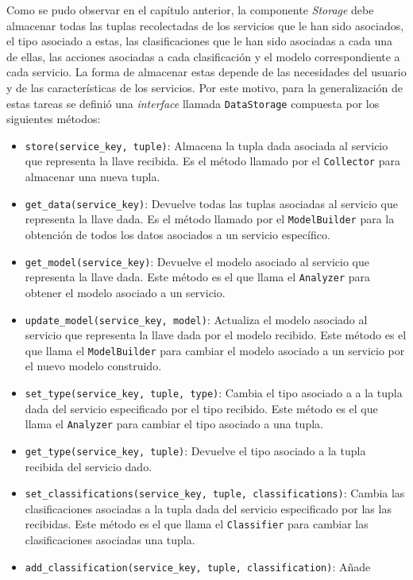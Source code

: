 Como se pudo observar en el capítulo anterior, la componente \textit{Storage} 
debe almacenar todas las tuplas recolectadas de los servicios que le han sido 
asociados, el tipo asociado a estas, las clasificaciones que le han sido 
asociadas a cada una de ellas, las acciones asociadas a cada clasificación y el 
modelo correspondiente a cada servicio. La forma de almacenar estas depende de 
las necesidades del usuario y de las características de los servicios. Por este 
motivo, para la generalización de estas tareas se definió una \textit{interface} 
llamada \texttt{DataStorage} compuesta por los siguientes métodos: 
\begin{itemize}
 \item \texttt{store(service\_key, tuple)}: Almacena la tupla dada asociada al
  servicio que representa la llave recibida. Es el método llamado por el
  \texttt{Collector} para almacenar una nueva tupla.
 \item \texttt{get\_data(service\_key)}:  Devuelve todas las tuplas asociadas al
  servicio que representa la llave dada. Es el método llamado por el
  \texttt{ModelBuilder} para la obtención de todos los datos asociados a un
  servicio específico.
 \item \texttt{get\_model(service\_key)}: Devuelve el modelo asociado al
  servicio que representa la llave dada. Este método es el que llama el
  \texttt{Analyzer} para obtener el modelo asociado a un servicio.
 \item \texttt{update\_model(service\_key, model)}: Actualiza el modelo asociado
  al servicio que representa la llave dada por el modelo recibido. Este método es
  el que llama el \texttt{ModelBuilder} para cambiar el modelo asociado a un
  servicio por el nuevo modelo construido.
 \item \texttt{set\_type(service\_key, tuple, type)}: Cambia el tipo asociado a
  a la tupla dada del servicio especificado por el tipo recibido. Este método es
  el que llama el \texttt{Analyzer} para cambiar el tipo asociado a una tupla.
 \item \texttt{get\_type(service\_key, tuple)}: Devuelve el tipo asociado a la
  tupla recibida del servicio dado. 
 \item \texttt{set\_classifications(service\_key, tuple, classifications)}:
  Cambia las clasificaciones asociadas a la tupla dada del servicio especificado
  por las las recibidas. Este método es el que llama el \texttt{Classifier} para
  cambiar las clasificaciones asociadas una tupla.
 \item \texttt{add\_classification(service\_key, tuple, classification)}: Añade 

\end{itemize}
